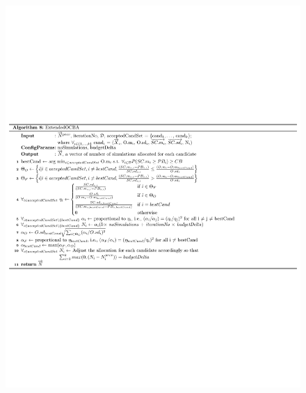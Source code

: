 \documentclass[a4paper, 12pt]{article} %
\begin{document}
\begin{figure}
	\begin{minipage}[b]{0.54\textwidth}
		\begin{center}
		\includegraphics[width=1\textwidth]{pseudoCode/Algo8.pdf}
	\end{center}
	\end{minipage}
	\hfill
	\begin{minipage}[b]{0.45\textwidth}
		\begin{center}

\end{center}
\end{minipage}
\end{figure}
\end{document}
